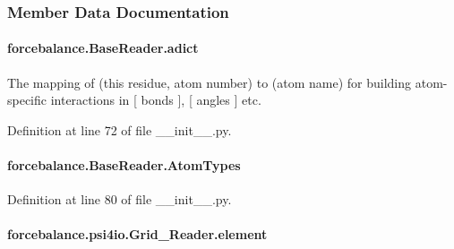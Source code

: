 \subsubsection{Member Data Documentation}
\hypertarget{classforcebalance_1_1BaseReader_a2c46ad6b66cf09a30e917ce4a1997e2a}{
\paragraph[{adict}]{\setlength{\rightskip}{0pt plus 5cm}forcebalance.\-Base\-Reader.\-adict\hspace{0.3cm}{\ttfamily [inherited]}}}\label{classforcebalance_1_1BaseReader_a2c46ad6b66cf09a30e917ce4a1997e2a}


The mapping of (this residue, atom number) to (atom name) for building atom-\/specific interactions in \mbox{[} bonds \mbox{]}, \mbox{[} angles \mbox{]} etc. 



Definition at line 72 of file \-\_\-\-\_\-init\-\_\-\-\_\-.\-py.

\hypertarget{classforcebalance_1_1BaseReader_a69ca7d949a4a3df4d9f61e617fe0e270}{
\paragraph[{Atom\-Types}]{\setlength{\rightskip}{0pt plus 5cm}forcebalance.\-Base\-Reader.\-Atom\-Types\hspace{0.3cm}{\ttfamily [inherited]}}}\label{classforcebalance_1_1BaseReader_a69ca7d949a4a3df4d9f61e617fe0e270}


Definition at line 80 of file \-\_\-\-\_\-init\-\_\-\-\_\-.\-py.

\hypertarget{classforcebalance_1_1psi4io_1_1Grid__Reader_aef1fb2c7e576834299a1f926f83061b5}{
\paragraph[{element}]{\setlength{\rightskip}{0pt plus 5cm}forcebalance.\-psi4io.\-Grid\-\_\-\-Reader.\-element}}\label{classforcebalance_1_1psi4io_1_1Grid__Reader_aef1fb2c7e576834299a1f926f83061b5}


